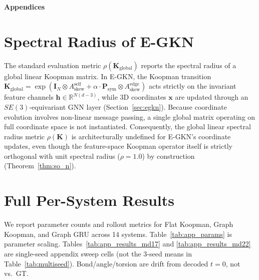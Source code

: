 \documentclass{article}
\newcommand{\K}{\mathbf{K}}
\newcommand{\x}{\mathbf{x}}
\newcommand{\Ask}{A_{\mathrm{skew}}}
\newcommand{\R}{\mathbb{R}}
\newcommand{\EGKN}{\textsc{E-GKN}}
\begin{document}
\appendix
\clearpage

\begin{center}
  \LARGE \textbf{Appendices}
\end{center}
\vspace{1em}

\section{Spectral Radius of E-GKN}
\label{app:egkn_rho}

The standard evaluation metric $\rho(\K_{\text{global}})$ reports the spectral radius of a global linear Koopman matrix. In \EGKN{}, the Koopman transition $\K_{\text{global}} = \exp(\mathbf{I}_N \otimes \Ask^{\text{self}} + \alpha \cdot \mathbf{P}_{\text{sym}} \otimes \Ask^{\text{edge}})$ acts strictly on the invariant feature channels $\mathbf{h} \in \R^{N(d-3)}$, while 3D coordinates $\x$ are updated through an $SE(3)$-equivariant GNN layer (Section~\ref{sec:egkn}). Because coordinate evolution involves non-linear message passing, a single global matrix operating on full coordinate space is not instantiated. Consequently, the global linear spectral radius metric $\rho(\K)$ is architecturally undefined for \EGKN{}'s coordinate updates, even though the feature-space Koopman operator itself is strictly orthogonal with unit spectral radius ($\rho = 1.0$) by construction (Theorem~\ref{thm:so_n}).

\section{Full Per-System Results}
\label{app:full_results}

We report parameter counts and rollout metrics for Flat Koopman, Graph Koopman, and Graph GRU across 14 systems. Table~\ref{tab:app_params} is parameter scaling. Tables~\ref{tab:app_results_md17} and \ref{tab:app_results_md22} are single-seed appendix sweep cells (not the 3-seed means in Table~\ref{tab:multiseed}). Bond/angle/torsion are drift from decoded $t=0$, not vs.\ GT.
\end{document}
